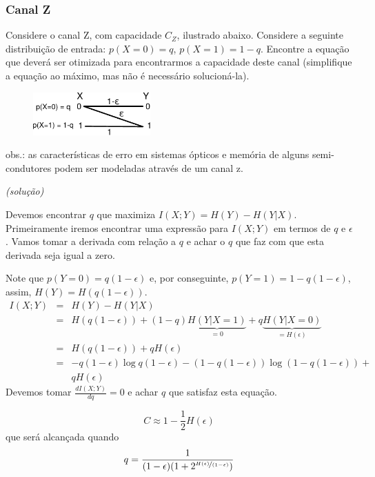 \begin{frame}[allowframebreaks]
  \frametitle{Canal Z}
  \begin{exercise}[Canal Z]
  Considere o canal Z, com capacidade $C_Z$, ilustrado abaixo. Considere
  a seguinte distribuição de entrada: $p(X=0) = q$, $p(X=1)=1-q$.
  Encontre a equação que deverá ser otimizada para encontrarmos a capacidade deste canal
  (simplifique a equação ao máximo, mas não é necessário solucioná-la).
  \begin{figure}[h!]
  \centering
  \includegraphics[width=0.4\textwidth]{images/canalz.pdf}
  \label{fig:canalz}
  \end{figure}

  obs.: as características de erro em sistemas ópticos e memória de alguns
	  semi-condutores podem ser modeladas através de um canal z.

  \exercisebreak
  \textit{(solução)}

  Devemos encontrar $q$ que maximiza $I(X;Y) = H(Y) - H(Y|X)$. Primeiramente iremos
  encontrar uma expressão para $I(X;Y)$ em termos de $q$ e $\epsilon$. Vamos tomar
  a derivada com relação a $q$ e achar o $q$ que faz com que esta derivada seja igual a zero.

  Note que $p(Y=0) = q(1-\epsilon)$ e, por conseguinte, $p(Y=1) =1 - q(1-\epsilon)$, assim,
  $H(Y) = H( q(1-\epsilon) )$.
  \exercisebreak
  \vspace{-2em}
  \begin{eqnarray}
  I(X;Y) &=& H(Y) - H(Y|X) \nonumber \\
	&=& H( q(1-\epsilon) ) + (1-q) \underbrace{H(Y|X=1)}_{=0} + q \underbrace{H(Y|X=0)}_{=H(\epsilon)} \nonumber \\
	&=& H( q(1-\epsilon) ) + q H(\epsilon) \nonumber \\
	&=& -q(1-\epsilon) \log q (1-\epsilon) - (1 - q(1-\epsilon)) \log (1 - q(1-\epsilon)) + \nonumber \\
	&& q H(\epsilon)
  \end{eqnarray}
  Devemos tomar $\frac{d I(X;Y)}{dq} = 0$ e achar $q$ que satisfaz esta equação.

  \exercisebreak

  \begin{equation}
  C \approx 1 - \frac{1}{2} H(\epsilon)
  \end{equation}
  que será alcançada quando
  \begin{equation}
	  q = \frac{1}{(1-\epsilon)(1+2^{\nicefrac{H(\epsilon)}{(1-\epsilon)}})}
  \end{equation}


\end{exercise}
\end{frame}
